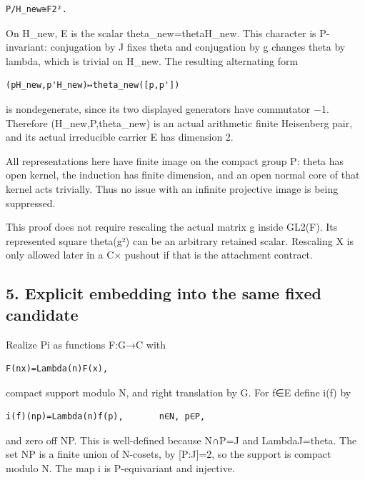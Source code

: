 \begin{Verbatim}[fontsize=\small,breaklines=true,breakanywhere=true]
P/H_new≅F2².
\end{Verbatim}

On H\_new, E is the scalar theta\_new=theta\textbar H\_new. This
character is P-invariant: conjugation by J fixes theta and conjugation
by g changes theta by lambda, which is trivial on H\_new. The resulting
alternating form

\begin{Verbatim}[fontsize=\small,breaklines=true,breakanywhere=true]
(pH_new,p'H_new)↦theta_new([p,p'])
\end{Verbatim}

is nondegenerate, since its two displayed generators have commutator −1.
Therefore (H\_new,P,theta\_new) is an actual arithmetic finite
Heisenberg pair, and its actual irreducible carrier E has dimension 2.

All representations here have finite image on the compact group P: theta
has open kernel, the induction has finite dimension, and an open normal
core of that kernel acts trivially. Thus no issue with an infinite projective image is being suppressed.

This proof does not require rescaling the actual matrix g inside GL2(F).
Its represented square theta(g²) can be an arbitrary retained scalar.
Rescaling X is only allowed later in a C× pushout if that is the
attachment contract.

\hypertarget{rank2-explicit-embedding-into-the-same-fixed-candidate}{%
\subsection{5. Explicit embedding into the same fixed
candidate}\label{rank2-explicit-embedding-into-the-same-fixed-candidate}}

Realize Pi as functions F:G→C with

\begin{Verbatim}[fontsize=\small,breaklines=true,breakanywhere=true]
F(nx)=Lambda(n)F(x),
\end{Verbatim}

compact support modulo N, and right translation by G. For f∈E define
i(f) by

\begin{Verbatim}[fontsize=\small,breaklines=true,breakanywhere=true]
i(f)(np)=Lambda(n)f(p),       n∈N, p∈P,
\end{Verbatim}

and zero off NP. This is well-defined because N∩P=J and
Lambda\textbar J=theta. The set NP is a finite union of N-cosets, by
{[}P:J{]}=2, so the support is compact modulo N. The map i is
P-equivariant and injective.

